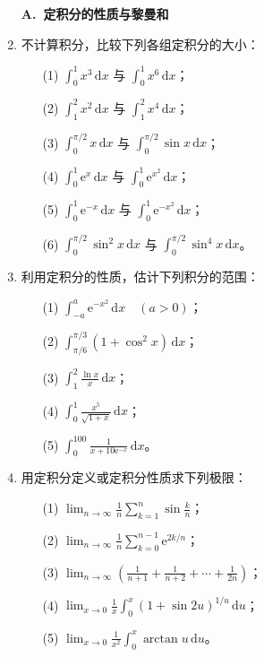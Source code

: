 \documentclass[fontset=fandol]{ctexart}
\newcommand{\dd}{\mathrm{d}}
\newcommand{\ee}{\mathrm{e}}
\begin{document}
\begin{enumerate}
\item[]\textbf{A.\ 定积分的性质与黎曼和}
\item 不计算积分，比较下列各组定积分的大小：
\begin{enumerate}
\item[(1)] $\displaystyle \int_0^1x^3\,\dd x$ 与 $\displaystyle \int_0^1x^6\,\dd x$；
\item[(2)] $\displaystyle \int_1^2x^2\,\dd x$ 与 $\displaystyle \int_1^2x^4\,\dd x$；
\item[(3)] $\displaystyle \int_0^{\pi/2}x\,\dd x$ 与 $\displaystyle \int_0^{\pi/2}\sin x\,\dd x$；
\item[(4)] $\displaystyle \int_0^1\ee^x\,\dd x$ 与 $\displaystyle \int_0^1\ee^{x^2}\,\dd x$；
\item[(5)] $\displaystyle \int_0^1\ee^{-x}\,\dd x$ 与 $\displaystyle \int_0^1\ee^{-x^2}\,\dd x$；
\item[(6)] $\displaystyle \int_0^{\pi/2}\sin^2x\,\dd x$ 与 $\displaystyle \int_0^{\pi/2}\sin^4x\,\dd x$。
\end{enumerate}

\item 利用定积分的性质，估计下列积分的范围：
\begin{enumerate}
\item[(1)] $\displaystyle \int_{-a}^{a}\ee^{-x^2}\,\dd x\quad(a>0)$；
\item[(2)] $\displaystyle \int_{\pi/6}^{\pi/3}(1+\cos^2x)\,\dd x$；
\item[(3)] $\displaystyle \int_1^2\frac{\ln x}{x}\,\dd x$；
\item[(4)] $\displaystyle \int_0^1\frac{x^5}{\sqrt{1+x}}\,\dd x$；
\item[(5)] $\displaystyle \int_0^{100}\frac{1}{x+10\ee^{-x}}\,\dd x$。
\end{enumerate}

\item 用定积分定义或定积分性质求下列极限：
\begin{enumerate}
\item[(1)] $\displaystyle \lim_{n\to\infty}\frac1n\sum_{k=1}^{n}\sin\frac{k}{n}$；
\item[(2)] $\displaystyle \lim_{n\to\infty}\frac1n\sum_{k=0}^{n-1}\ee^{2k/n}$；
\item[(3)] $\displaystyle \lim_{n\to\infty}\left(\frac1{n+1}+\frac1{n+2}+\cdots+\frac1{2n}\right)$；
\item[(4)] $\displaystyle \lim_{x\to0}\frac1x\int_0^x(1+\sin 2u)^{1/u}\,\dd u$；
\item[(5)] $\displaystyle \lim_{x\to0}\frac1{x^2}\int_0^x\arctan u\,\dd u$。
\end{enumerate}


\end{enumerate}
\end{document}
